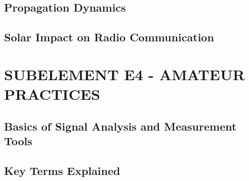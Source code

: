\documentclass[12pt]{book}
\begin{document}
\section{Propagation Dynamics}













\section{Solar Impact on Radio Communication}












\chapter{SUBELEMENT E4 - AMATEUR PRACTICES}
\section{Basics of Signal Analysis and Measurement Tools}











\section{Key Terms Explained}











\end{document}
